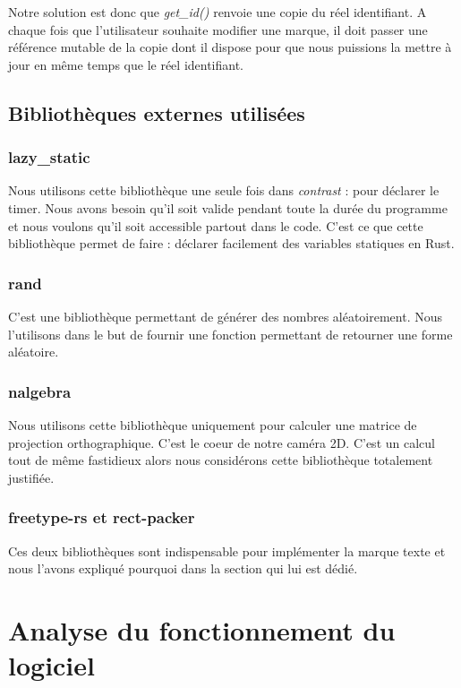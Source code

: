 \documentclass[12pt]{article}
\begin{document}
Notre solution est donc que \textit{get\_id()} renvoie une copie du réel identifiant. A chaque
fois que l'utilisateur souhaite modifier une marque, il doit passer une référence mutable
de la copie dont il dispose pour que nous puissions la mettre à jour en même temps que
le réel identifiant.

\subsection{Bibliothèques externes utilisées}
\subsubsection{lazy\_static}
Nous utilisons cette bibliothèque \cite{lazy-static} une seule fois dans
\textit{contrast} : pour déclarer le timer. Nous avons besoin qu'il soit valide pendant
toute la durée du programme et nous voulons qu'il soit accessible partout dans le code.
C'est ce que cette bibliothèque permet de faire : déclarer facilement des variables
statiques en Rust.

\subsubsection{rand}
C'est une bibliothèque \cite{rand} permettant de générer des nombres aléatoirement. Nous
l'utilisons dans le but de fournir une fonction permettant de retourner une forme
aléatoire.

\subsubsection{nalgebra}
Nous utilisons cette bibliothèque \cite{nalgebra} uniquement pour calculer une matrice de projection orthographique.
C'est le coeur de notre caméra 2D. C'est un calcul tout de même fastidieux alors nous considérons cette bibliothèque totalement justifiée.

\subsubsection{freetype-rs et rect-packer}
Ces deux bibliothèques sont indispensable pour implémenter la marque texte et nous l'avons expliqué pourquoi dans la section qui lui est dédié.

\section{Analyse du fonctionnement du logiciel}
\end{document}
